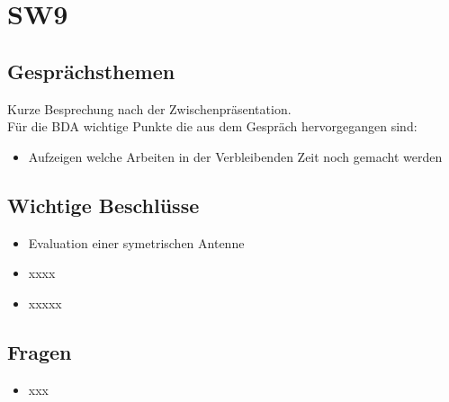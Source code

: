 \documentclass[10pt,a4paper]{article}
\begin{document}
\section*{SW9}

\subsection*{Gesprächsthemen}

Kurze Besprechung nach der Zwischenpräsentation.\\

\vspace{10 mm}
Für die BDA wichtige Punkte die aus dem Gespräch hervorgegangen sind:
\begin{itemize}
	\item Aufzeigen welche Arbeiten  in der Verbleibenden Zeit noch gemacht werden
\end{itemize}

\subsection*{Wichtige Beschlüsse}

\begin{itemize}
	\item Evaluation einer symetrischen Antenne
	\item xxxx
	\item xxxxx 
\end{itemize}
\subsection*{Fragen}
\begin{itemize}
	\item xxx
\end{itemize}
\end{document}
